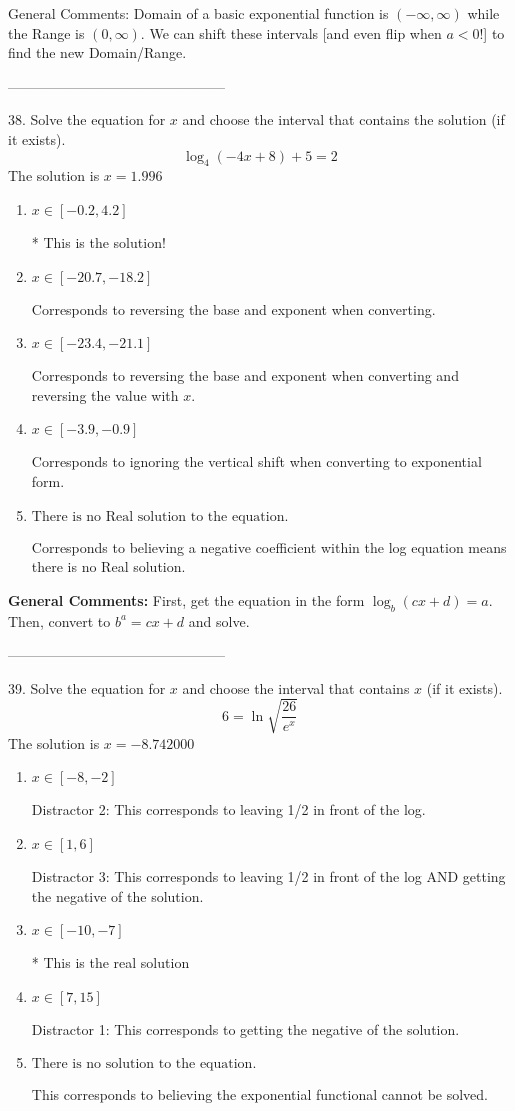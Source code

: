 \documentclass{article}[10pt]
\begin{document}
General Comments: Domain of a basic exponential function is $(-\infty, \infty)$ while the Range is $(0, \infty)$. We can shift these intervals [and even flip when $a<0$!] to find the new Domain/Range.

-----------------------------------------------

38. Solve the equation for $x$ and choose the interval that contains the solution (if it exists).
$$ \log_{4}{(-4x+8)}+5 = 2 $$ 
The solution is $ x = 1.996 $ 

\begin{enumerate}[label=\Alph*.] 
\item $ x \in [-0.2, 4.2] $ 

 * This is the solution! 
\item $ x \in [-20.7, -18.2] $ 

  Corresponds to reversing the base and exponent when converting. 
\item $ x \in [-23.4, -21.1] $ 

  Corresponds to reversing the base and exponent when converting and reversing the value with $x$. 
\item $ x \in [-3.9, -0.9] $ 

  Corresponds to ignoring the vertical shift when converting to exponential form. 
\item $ \text{There is no Real solution to the equation.} $ 

  Corresponds to believing a negative coefficient within the log equation means there is no Real solution. 
\end{enumerate} 
 
\textbf{General Comments:} First, get the equation in the form $\log_b{(cx+d)} = a$. Then, convert to $b^a = cx+d$ and solve.

-----------------------------------------------

39.  Solve the equation for $x$ and choose the interval that contains $x$ (if it exists).
$$  6 = \ln{\sqrt{\frac{26}{e^x}}} $$ 
The solution is $ x = -8.742000 $ 

\begin{enumerate}[label=\Alph*.] 
\item $ x \in [-8,-2] $ 

  Distractor 2: This corresponds to leaving 1/2 in front of the log. 
\item $ x \in [1,6] $ 

  Distractor 3: This corresponds to leaving 1/2 in front of the log AND getting the negative of the solution. 
\item $ x \in [-10,-7] $ 

 * This is the real solution 
\item $ x \in [7,15] $ 

  Distractor 1: This corresponds to getting the negative of the solution. 
\item $ \text{There is no solution to the equation.} $ 

 This corresponds to believing the exponential functional cannot be solved. 
\end{enumerate} 
 
\end{document}
